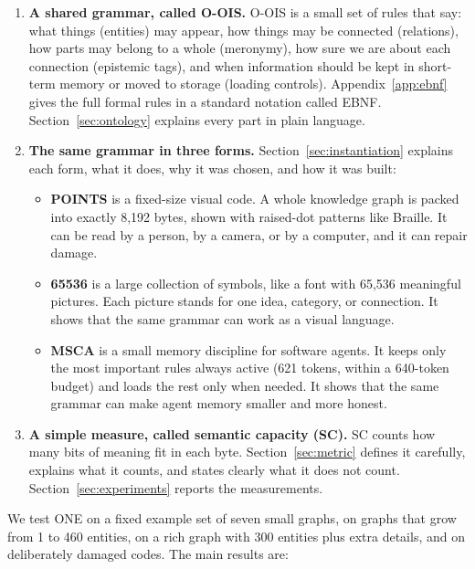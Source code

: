 \begin{enumerate}
\item \textbf{A shared grammar, called O-OIS.} O-OIS is a small set of rules that say: what things (entities) may appear, how things may be connected (relations), how parts may belong to a whole (meronymy), how sure we are about each connection (epistemic tags), and when information should be kept in short-term memory or moved to storage (loading controls). Appendix~\ref{app:ebnf} gives the full formal rules in a standard notation called EBNF. Section~\ref{sec:ontology} explains every part in plain language.

\item \textbf{The same grammar in three forms.} Section~\ref{sec:instantiation} explains each form, what it does, why it was chosen, and how it was built:
\begin{itemize}
\item \textbf{POINTS} is a fixed-size visual code. A whole knowledge graph is packed into exactly 8,192 bytes, shown with raised-dot patterns like Braille. It can be read by a person, by a camera, or by a computer, and it can repair damage.
\item \textbf{65536} is a large collection of symbols, like a font with 65,536 meaningful pictures. Each picture stands for one idea, category, or connection. It shows that the same grammar can work as a visual language.
\item \textbf{MSCA} is a small memory discipline for software agents. It keeps only the most important rules always active (621 tokens, within a 640-token budget) and loads the rest only when needed. It shows that the same grammar can make agent memory smaller and more honest.
\end{itemize}

\item \textbf{A simple measure, called semantic capacity (SC).} SC counts how many bits of meaning fit in each byte. Section~\ref{sec:metric} defines it carefully, explains what it counts, and states clearly what it does not count. Section~\ref{sec:experiments} reports the measurements.
\end{enumerate}

We test ONE on a fixed example set of seven small graphs, on graphs that grow from 1 to 460 entities, on a rich graph with 300 entities plus extra details, and on deliberately damaged codes. The main results are:

